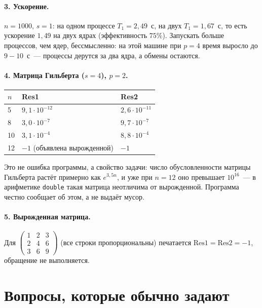 \documentclass[11pt,a4paper]{report}
\begin{document}
\paragraph{3. Ускорение.} $n=1000$, $s=1$: на одном процессе $T_1=2{,}49$~с,
на двух $T_1=1{,}67$~с, то есть ускорение $1{,}49$ на двух ядрах
(эффективность $75\%$). Запускать больше процессов, чем ядер, бессмысленно:
на этой машине при $p=4$ время выросло до $9\!-\!10$~с~--- процессы дерутся за
два ядра, а обмены остаются.

\paragraph{4. Матрица Гильберта ($s=4$), $p=2$.}
\begin{center}
\begin{tabular}{lll}
\toprule
$n$ & Res1 & Res2 \\
\midrule
5  & $9{,}1\cdot10^{-12}$ & $2{,}6\cdot10^{-11}$ \\
8  & $3{,}0\cdot10^{-7}$  & $9{,}7\cdot10^{-7}$ \\
10 & $3{,}1\cdot10^{-4}$  & $8{,}8\cdot10^{-4}$ \\
12 & $-1$ (объявлена вырожденной) & $-1$ \\
\bottomrule
\end{tabular}
\end{center}
Это не ошибка программы, а свойство задачи: число обусловленности матрицы
Гильберта растёт примерно как $e^{3{,}5n}$, и уже при $n=12$ оно превышает
$10^{16}$~--- в арифметике \texttt{double} такая матрица неотличима от
вырожденной. Программа честно сообщает об этом, а не выдаёт мусор.

\paragraph{5. Вырожденная матрица.} Для
$\begin{pmatrix}1&2&3\\2&4&6\\3&6&9\end{pmatrix}$ (все строки
пропорциональны) печатается $\mathrm{Res1}=\mathrm{Res2}=-1$, обращение не
выполняется.

\section{Вопросы, которые обычно задают}
\end{document}
